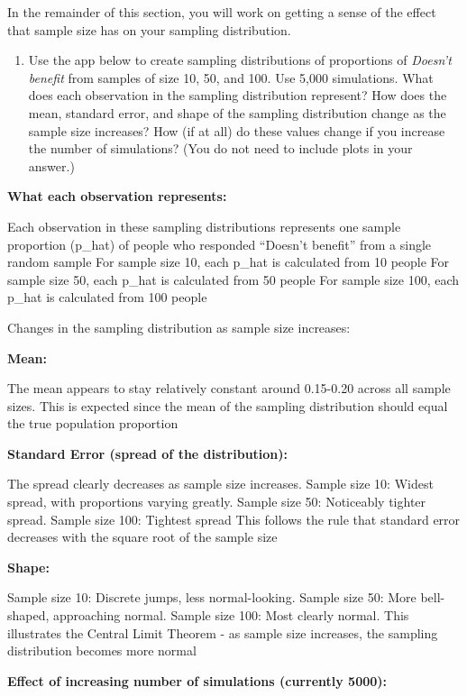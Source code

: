 \documentclass[
]{article}
\providecommand{\tightlist}{%
  \setlength{\itemsep}{0pt}\setlength{\parskip}{0pt}}
\begin{document}
In the remainder of this section, you will work on getting a sense of
the effect that sample size has on your sampling distribution.

\begin{enumerate}
\def\labelenumi{\arabic{enumi}.}
\setcounter{enumi}{5}
\tightlist
\item
  Use the app below to create sampling distributions of proportions of
  \emph{Doesn't benefit} from samples of size 10, 50, and 100. Use 5,000
  simulations. What does each observation in the sampling distribution
  represent? How does the mean, standard error, and shape of the
  sampling distribution change as the sample size increases? How (if at
  all) do these values change if you increase the number of simulations?
  (You do not need to include plots in your answer.)
\end{enumerate}

\textbf{What each observation represents:}

Each observation in these sampling distributions represents one sample
proportion (p\_hat) of people who responded ``Doesn't benefit'' from a
single random sample For sample size 10, each p\_hat is calculated from
10 people For sample size 50, each p\_hat is calculated from 50 people
For sample size 100, each p\_hat is calculated from 100 people

Changes in the sampling distribution as sample size increases:

\textbf{Mean:}

The mean appears to stay relatively constant around 0.15-0.20 across all
sample sizes. This is expected since the mean of the sampling
distribution should equal the true population proportion

\textbf{Standard Error (spread of the distribution):}

The spread clearly decreases as sample size increases. Sample size 10:
Widest spread, with proportions varying greatly. Sample size 50:
Noticeably tighter spread. Sample size 100: Tightest spread This follows
the rule that standard error decreases with the square root of the
sample size

\textbf{Shape:}

Sample size 10: Discrete jumps, less normal-looking. Sample size 50:
More bell-shaped, approaching normal. Sample size 100: Most clearly
normal. This illustrates the Central Limit Theorem - as sample size
increases, the sampling distribution becomes more normal

\textbf{Effect of increasing number of simulations (currently 5000):}
\end{document}
